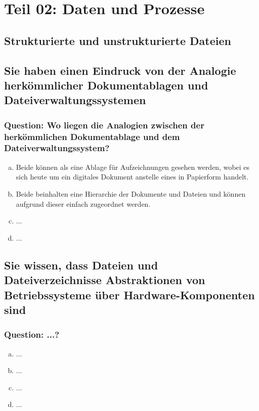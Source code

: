 \documentclass{article}
\begin{document}
	\section*{Teil 02: Daten und Prozesse}
	\begin{adjustwidth}{2em}{2em}
		\section{Strukturierte und unstrukturierte Dateien}
		\begin{adjustwidth}{2em}{2em}
			\subsection{Sie haben einen Eindruck von der Analogie herkömmlicher Dokumentablagen und Dateiverwaltungssystemen}
			\begin{adjustwidth}{1em}{}
				\subsubsection*{Question: Wo liegen die Analogien zwischen der herkömmlichen Dokumentablage und dem Dateiverwaltungssystem?}
				\begin{adjustwidth}{1em}{}
					\begin{enumerate}[(a)]
						\item Beide können als eine Ablage für Aufzeichnungen gesehen werden, wobei es sich heute um ein digitales Dokument anstelle eines in Papierform handelt.
						\item Beide beinhalten eine Hierarchie der Dokumente und Dateien und können aufgrund dieser einfach zugeordnet werden.
						\item ...
						\item ...
					\end{enumerate}
				\end{adjustwidth}
			\end{adjustwidth}
			\subsection{Sie wissen, dass Dateien und Dateiverzeichnisse Abstraktionen von Betriebssysteme über Hardware-Komponenten sind}
			\begin{adjustwidth}{1em}{}
				\subsubsection*{Question: ...?}
				\begin{adjustwidth}{1em}{}
					\begin{enumerate}[(a)]
						\item ...
						\item ...
						\item ...
						\item ...
					\end{enumerate}
				\end{adjustwidth}
			\end{adjustwidth}

\end{adjustwidth}
\end{adjustwidth}
\end{document}
